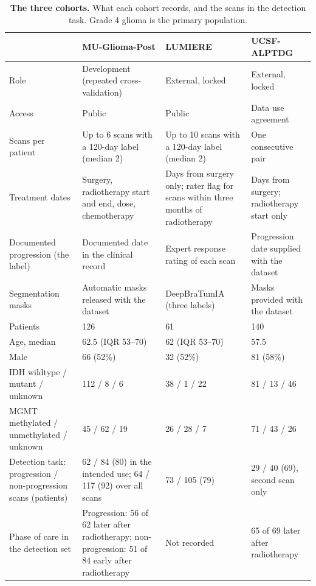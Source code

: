 \documentclass[largeformat]{interact} %
\begin{document}
\begin{table}[!htbp]
\centering
\caption[The three cohorts]{\textbf{The three cohorts.} What each cohort records, and the scans in the detection task.
Grade 4 glioma is the primary population.}
\label{tab:1}
\begin{threeparttable}
\begin{tabularx}{\linewidth}{@{}R{3.3cm}LLL@{}}
\toprule
 & MU-Glioma-Post & LUMIERE & UCSF-ALPTDG \\
\midrule
Role & Development (repeated cross-validation) & External, locked & External, locked \\
Access & Public & Public & Data use agreement \\
Scans per patient & Up to 6 scans with a 120-day label (median 2) & Up to 10 scans with a 120-day label (median 2) & One consecutive pair \\
Treatment dates & Surgery, radiotherapy start and end, dose, chemotherapy & Days from surgery only; rater flag for scans within three months of radiotherapy & Days from surgery; radiotherapy start only \\
Documented progression (the label) & Documented date in the clinical record & Expert response rating of each scan & Progression date supplied with the dataset \\
Segmentation masks & Automatic masks released with the dataset & DeepBraTumIA (three labels) & Masks provided with the dataset \\
\addlinespace
Patients & 126 & 61 & 140 \\
Age, median & 62.5 (IQR 53--70) & 62 (IQR 53--70) & 57.5 \\
Male & 66 (52\%) & 32 (52\%) & 81 (58\%) \\
IDH wildtype / mutant / unknown & 112 / 8 / 6 & 38 / 1 / 22 & 81 / 13 / 46 \\
MGMT methylated / unmethylated / unknown & 45 / 62 / 19 & 26 / 28 / 7 & 71 / 43 / 26 \\
\addlinespace
Detection task: progression / non-progression scans (patients) & 62 / 84 (80) in the intended use; 64 / 117 (92) over all scans & 73 / 105 (79) & 29 / 40 (69), second scan only \\
Phase of care in the detection set & Progression: 56 of 62 later after radiotherapy; non-progression: 51 of 84 early after radiotherapy & Not recorded & 65 of 69 later after radiotherapy \\
\bottomrule
\end{tabularx}
\begin{tablenotes}\footnotesize

\end{tablenotes}
\end{threeparttable}
\end{table}
\end{document}
